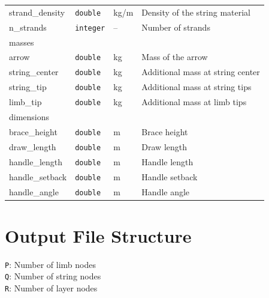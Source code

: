\documentclass[12pt]{article}
\begin{document}
\begin{table}[H]
{\begin{tabular}{ l | l | l | l }
\quad strand\_density & \texttt{double} & \unit[]{kg/m} & Density of the string material \\
\quad n\_strands & \texttt{integer} & -- & Number of strands \\
\tablespace masses & & & \\
\quad arrow & \texttt{double} & \unit[]{kg} & Mass of the arrow \\
\quad string\_center & \texttt{double} & \unit[]{kg} & Additional mass at string center \\
\quad string\_tip & \texttt{double} & \unit[]{kg} & Additional mass at string tips \\
\quad limb\_tip & \texttt{double} & \unit[]{kg} & Additional mass at limb tips \\
\tablespace dimensions & & & \\
\quad brace\_height & \texttt{double} & \unit[]{m} & Brace height \\
\quad draw\_length & \texttt{double} & \unit[]{m} & Draw length \\
\quad handle\_length & \texttt{double} & \unit[]{m} & Handle length \\
\quad handle\_setback & \texttt{double} & \unit[]{m} & Handle setback \\
\quad handle\_angle & \texttt{double} & \unit[]{m} & Handle angle
\end{tabular}}
\end{table}

\newpage
\section{Output File Structure}
\label{sec:output-structure}

\footnotesize{
\texttt{P}: Number of limb nodes\\
\texttt{Q}: Number of string nodes\\
\texttt{R}: Number of layer nodes
}
\end{document}
